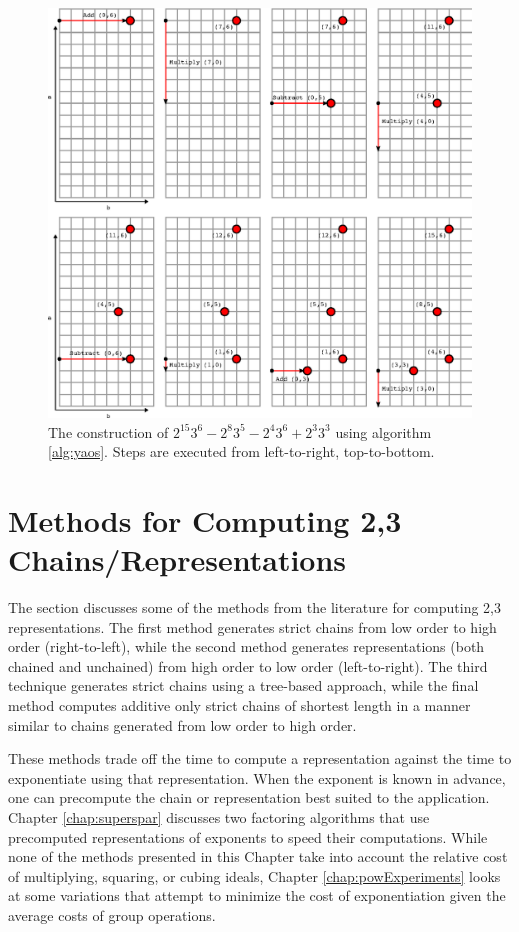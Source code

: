 \documentclass{ucalgthes1}
\theoremstyle{definition}
\begin{document}
\begin{figure}[H]
\centering
\includegraphics{yao1}
\caption{The construction of $2^{15} 3^6 - 2^8 3^5 - 2^4 3^6 + 2^3 3^3$ using algorithm \ref{alg:yaos}.  Steps are executed from left-to-right, top-to-bottom.}
\label{fig:yao1}
\end{figure}


\section{Methods for Computing 2,3 Chains/Representations}
\label{sec:dbnsMethods}

The section discusses some of the methods from the literature for computing 2,3 representations. The first method generates strict chains from low order to high order (right-to-left), while the second method generates representations (both chained and unchained) from high order to low order (left-to-right).  The third technique generates strict chains using a tree-based approach, while the final method computes additive only strict chains of shortest length in a manner similar to chains generated from low order to high order.  

These methods trade off the time to compute a representation against the time to exponentiate using that representation.  When the exponent is known in advance, one can precompute the chain or representation best suited to the application.  Chapter \ref{chap:superspar} discusses two factoring algorithms that use precomputed representations of exponents to speed their computations.  While none of the methods presented in this Chapter take into account the relative cost of multiplying, squaring, or cubing ideals, Chapter \ref{chap:powExperiments} looks at some variations that attempt to minimize the cost of exponentiation given the average costs of group operations.  
\end{document}
